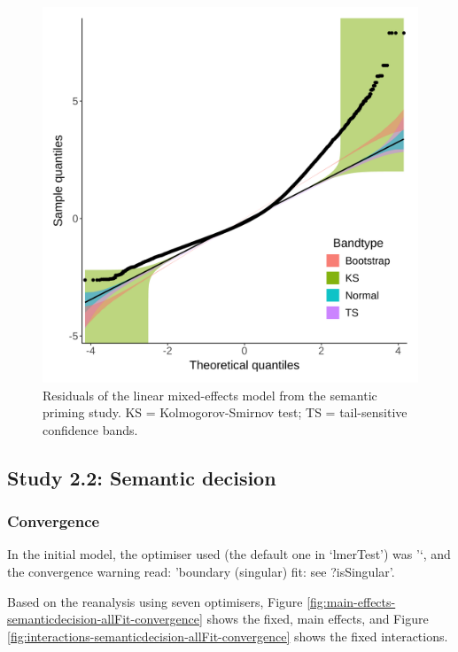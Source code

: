 \documentclass[
  12pt,
  man,floatsintext]{apa7}
\begin{document}
\begin{figure}

{\centering \includegraphics[width=0.65\linewidth]{../semanticpriming/analysis_with_visualsimilarity/model_diagnostics/plots/semanticpriming_with_visualsimilarity_residuals} 

}

\caption{Residuals of the linear mixed-effects model from the semantic priming study. \linebreak KS = Kolmogorov-Smirnov test; TS = tail-sensitive confidence bands.}\label{fig:semanticpriming-with-visualsimilarity-residuals}
\end{figure}

\hypertarget{study-2.2-semantic-decision-2}{%
\subsection{Study 2.2: Semantic decision}\label{study-2.2-semantic-decision-2}}

\hypertarget{convergence-4}{%
\subsubsection{Convergence}\label{convergence-4}}

In the initial model, the optimiser used (the default one in `lmerTest') was '`, and the convergence warning read: 'boundary (singular) fit: see ?isSingular'.

Based on the reanalysis using seven optimisers, Figure \ref{fig:main-effects-semanticdecision-allFit-convergence} shows the fixed, main effects, and Figure \ref{fig:interactions-semanticdecision-allFit-convergence} shows the fixed interactions.
\end{document}
